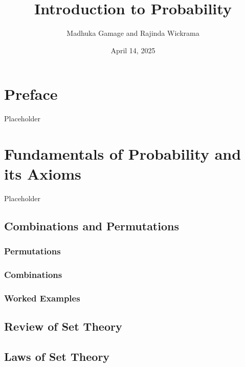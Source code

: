 \documentclass[
  12pt,
]{krantzNoCorner}
\title{Introduction to Probability}
\author{Madhuka Gamage and Rajinda Wickrama}
\date{April 14, 2025}
\begin{document}
\maketitle

{
\hypersetup{linkcolor=}
\setcounter{tocdepth}{2}
\tableofcontents
}
\hypertarget{preface}{%
\chapter*{Preface}\label{preface}}


Placeholder

\hypertarget{fundamentals-of-probability-and-its-axioms}{%
\chapter{Fundamentals of Probability and its Axioms}\label{fundamentals-of-probability-and-its-axioms}}

Placeholder

\hypertarget{combinations-and-permutations}{%
\section{Combinations and Permutations}\label{combinations-and-permutations}}

\hypertarget{permutations}{%
\subsection{Permutations}\label{permutations}}

\hypertarget{combinations}{%
\subsection{Combinations}\label{combinations}}

\hypertarget{worked-examples}{%
\subsection{Worked Examples}\label{worked-examples}}

\hypertarget{review-of-set-theory}{%
\section{Review of Set Theory}\label{review-of-set-theory}}

\hypertarget{laws-of-set-theory}{%
\section{Laws of Set Theory}\label{laws-of-set-theory}}
\end{document}
